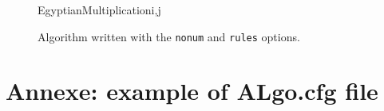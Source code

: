 \documentclass{article}
\begin{document}
\begin{figure}
\begin{center}
\begin{algo}{EgyptianMultiplication}{i,j}
\OD
{}
  \FI
\OD
{}
\end{algo}
\end{center}
\caption{\label{ex2}Algorithm written with the \texttt{nonum} and \texttt{rules}
 options.}
\end{figure}

\section{\label{annexe}Annexe: example of ALgo.cfg file}
\end{document}
